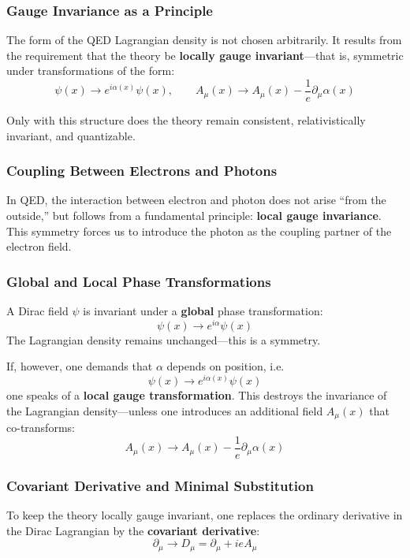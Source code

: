 \subsubsection*{Gauge Invariance as a Principle}
The form of the QED Lagrangian density is not chosen arbitrarily. It results from the requirement that the theory be \textbf{locally gauge invariant}—that is, symmetric under transformations of the form:
\[
\psi(x) \rightarrow e^{i\alpha(x)} \psi(x), \qquad A_\mu(x) \rightarrow A_\mu(x) - \frac{1}{e} \partial_\mu \alpha(x)
\]

Only with this structure does the theory remain consistent, relativistically invariant, and quantizable.

\subsubsection{Coupling Between Electrons and Photons}

In QED, the interaction between electron and photon does not arise “from the outside,” but follows from a fundamental principle: \textbf{local gauge invariance}. This symmetry forces us to introduce the photon as the coupling partner of the electron field.

\subsubsection*{Global and Local Phase Transformations}
A Dirac field $\psi$ is invariant under a \textbf{global} phase transformation:
\[
\psi(x) \rightarrow e^{i\alpha} \psi(x)
\]
The Lagrangian density remains unchanged—this is a symmetry.

If, however, one demands that $\alpha$ depends on position, i.e.
\[
\psi(x) \rightarrow e^{i\alpha(x)} \psi(x)
\]
one speaks of a \textbf{local gauge transformation}. This destroys the invariance of the Lagrangian density—unless one introduces an additional field $A_\mu(x)$ that co-transforms:
\[
A_\mu(x) \rightarrow A_\mu(x) - \frac{1}{e} \partial_\mu \alpha(x)
\]

\subsubsection*{Covariant Derivative and Minimal Substitution}
To keep the theory locally gauge invariant, one replaces the ordinary derivative in the Dirac Lagrangian by the \textbf{covariant derivative}:
\[
\partial_\mu \rightarrow D_\mu = \partial_\mu + ie A_\mu
\]

